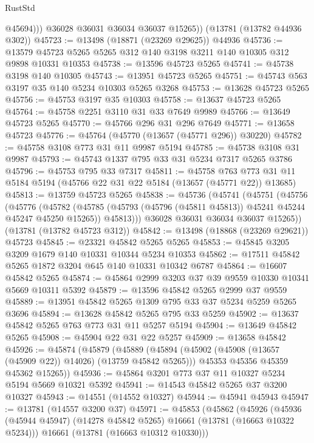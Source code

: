\begin{lexlean}{RustStd}
\begin{coremodule}
              @45694)))
        @36028
        @36031
        @36034
        @36037
        @15265))
    (@13781 (@13782 @44936 @302))
@45723 := @13498 (@18871 (@23269 @29625)) @44936
@45736 := @13579 @45723 @5265 @5265 @312 @140 @3198 @3211 @140 @10305 @312 @9898 @10331 @10353
@45738 := @13596 @45723 @5265
@45741 := @45738 @3198 @140 @10305
@45743 := @13951 @45723 @5265
@45751 := @45743 @563 @3197 @35 @140 @5234 @10303 @5265 @3268
@45753 := @13628 @45723 @5265
@45756 := @45753 @3197 @35 @10303
@45758 := @13637 @45723 @5265
@45764 := @45758 @2251 @3110 @31 @33 @7649 @9989
@45766 := @13649 @45723 @5265
@45770 := @45766 @296 @31 @296 @7649
@45771 := @13658 @45723
@45776 := @45764 (@45770 (@13657 (@45771 @296)) @30220)
@45782 := @45758 @3108 @773 @31 @11 @9987 @5194
@45785 := @45738 @3108 @31 @9987
@45793 := @45743 @1337 @795 @33 @31 @5234 @7317 @5265 @3786
@45796 := @45753 @795 @33 @7317
@45811 := @45758
    @763
    @773
    @31
    @11
    @5184
    @5194
    (@45766 @22 @31 @22 @5184 (@13657 (@45771 @22)) @13685)
@45813 := @13759 @45723 @5265
@45838 := @45736
    (@45741
      (@45751
        (@45756
          (@45776
            (@45782
              (@45785 (@45793 (@45796 (@45811 @45813)) @45241 @45244 @45247 @45250 @15265))
              @45813)))
        @36028
        @36031
        @36034
        @36037
        @15265))
    (@13781 (@13782 @45723 @312))
@45842 := @13498 (@18868 (@23269 @29621)) @45723
@45845 := @23321 @45842 @5265 @5265
@45853 := @45845 @3205 @3209 @1679 @140 @10331 @10344 @5234 @10353
@45862 := @17511 @45842 @5265 @1872 @3204 @645 @140 @10331 @10342 @6787
@45864 := @16607 @45842 @5265
@45874 := @45864 @2999 @3203 @37 @39 @9559 @10330 @10341 @5669 @10311 @5392
@45879 := @13596 @45842 @5265 @2999 @37 @9559
@45889 := @13951 @45842 @5265 @1309 @795 @33 @37 @5234 @5259 @5265 @3696
@45894 := @13628 @45842 @5265 @795 @33 @5259
@45902 := @13637 @45842 @5265 @763 @773 @31 @11 @5257 @5194
@45904 := @13649 @45842 @5265
@45908 := @45904 @22 @31 @22 @5257
@45909 := @13658 @45842
@45926 := @45874
    (@45879
      (@45889
        (@45894 (@45902 (@45908 (@13657 (@45909 @22)) @14026) (@13759 @45842 @5265)))
        @45353
        @45356
        @45359
        @45362
        @15265))
@45936 := @45864 @3201 @773 @37 @11 @10327 @5234 @5194 @5669 @10321 @5392
@45941 := @14543 @45842 @5265 @37 @3200 @10327
@45943 := @14551 (@14552 @10327)
@45944 := @45941 @45943
@45947 := @13781 (@14557 @3200 @37)
@45971 := @45853
    (@45862
      (@45926
        (@45936 (@45944 @45947) (@14278 @45842 @5265) @16661 (@13781 (@16663 @10322 @5234)))
        @16661
        (@13781 (@16663 @10312 @10330)))

\end{coremodule}
\end{lexlean}
